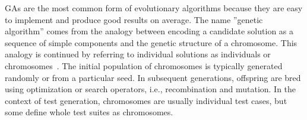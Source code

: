 \documentclass{article}
\begin{document}
\acp{GA} are the most common form of evolutionary algorithms because they are easy to implement and produce good results on average. The name ''genetic algorithm'' comes from the analogy between encoding a candidate solution as a sequence of simple components and the genetic structure of a chromosome. This analogy is continued by referring to individual solutions as individuals or chromosomes~\cite{Campos2017}. The initial population of chromosomes is typically generated randomly or from a particular seed. In subsequent generations, offspring are bred using optimization or search operators, i.e., recombination and mutation. In the context of test generation, chromosomes are usually individual test cases, but some define whole test suites as chromosomes.

\end{document}
